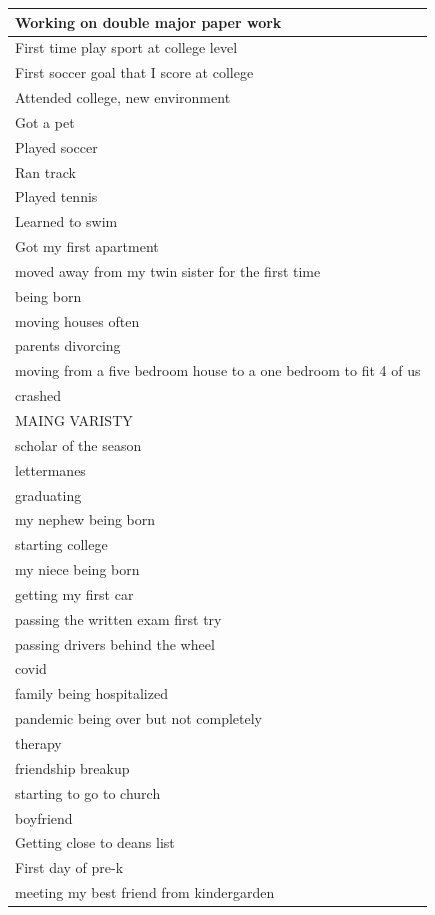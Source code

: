 \documentclass[
  .7em,
  letterpaper,
  DIV=11,
  numbers=noendperiod]{scrartcl}
\begin{document}
\begin{table}
\begin{tabular}{l}
Working on double major paper work\\
\hline
First time play sport at college level\\
\hline
First soccer goal that I score at college\\
\hline
Attended college, new environment\\
\hline
Got a pet\\
\hline
Played soccer\\
\hline
Ran track\\
\hline
Played tennis\\
\hline
Learned to swim\\
\hline
Got my first apartment\\
\hline
moved away from my twin sister for the first time\\
\hline
being born\\
\hline
moving houses often\\
\hline
parents divorcing\\
\hline
moving from a five bedroom house to a one bedroom to fit 4 of us\\
\hline
crashed\\
\hline
MAING VARISTY\\
\hline
scholar of the season\\
\hline
lettermanes\\
\hline
graduating\\
\hline
my nephew being born\\
\hline
starting college\\
\hline
my niece being born\\
\hline
getting my first car\\
\hline
passing the written exam first try\\
\hline
passing drivers behind the wheel\\
\hline
covid\\
\hline
family being hospitalized\\
\hline
pandemic being over but not completely\\
\hline
therapy\\
\hline
friendship breakup\\
\hline
starting to go to church\\
\hline
boyfriend\\
\hline
Getting close to deans list\\
\hline
First day of pre-k\\
\hline
meeting my best friend from kindergarden\\
\hline

\end{tabular}
\end{table}
\end{document}
